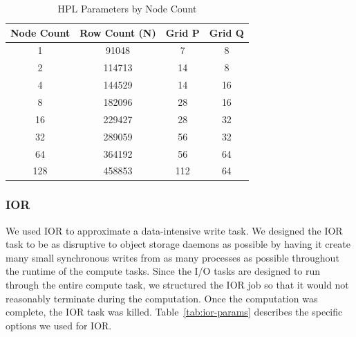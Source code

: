 \begin{table}[htbp]
\caption{HPL Parameters by Node Count}
\begin{center}
\begin{tabular}{|c|c|c|c|}
\hline
\textbf{Node Count}&\textbf{Row Count (N)} & \textbf{Grid P} & \textbf{Grid Q} \\
\hline
1 & 91048 & 7 & 8 \\
2 & 114713 & 14 & 8 \\
4 & 144529 & 14 & 16 \\
8 & 182096 & 28 & 16 \\
16 & 229427 & 28 & 32 \\
32 & 289059 & 56 & 32 \\
64 & 364192 & 56 & 64 \\
128 & 458853 & 112 & 64 \\
\hline
\end{tabular}
\label{tab:hpl-params}
\end{center}
\end{table}

\subsubsection{IOR}
We used IOR to approximate a data-intensive write task. We designed the IOR task to be as disruptive to object storage daemons as possible by having it create many small synchronous writes from as many processes as possible throughout the runtime of the compute tasks. Since the I/O tasks are designed to run through the entire compute task, we structured the IOR job so that it would not reasonably terminate during the computation. Once the computation was complete, the IOR task was killed. Table~\ref{tab:ior-params} describes the specific options we used for IOR.

